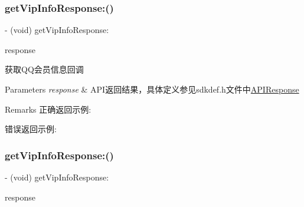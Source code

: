 \subsubsection{\texorpdfstring{get\+Vip\+Info\+Response\+:()}{getVipInfoResponse:()}\hspace{0.1cm}{\footnotesize\ttfamily [1/2]}}
{\footnotesize\ttfamily -\/ (void) get\+Vip\+Info\+Response\+: \begin{DoxyParamCaption}\item[{(\mbox{\hyperlink{interface_a_p_i_response}{A\+P\+I\+Response}} $\ast$)}]{response }\end{DoxyParamCaption}\hspace{0.3cm}{\ttfamily [optional]}}

获取\+Q\+Q会员信息回调 
\begin{DoxyParams}{Parameters}
{\em response} & A\+P\+I返回结果，具体定义参见sdkdef.\+h文件中\mbox{\hyperlink{interface_a_p_i_response}{A\+P\+I\+Response}} \\
\hline
\end{DoxyParams}
\begin{DoxyRemark}{Remarks}
正确返回示例\+: 
\begin{DoxyCodeInclude}
\end{DoxyCodeInclude}
 错误返回示例\+: 
\begin{DoxyCodeInclude}
\end{DoxyCodeInclude}

\end{DoxyRemark}
\mbox{\label{protocol_tencent_session_delegate-p_ad0d91a95626727d1dc20fb96df2d442a}} 
\subsubsection{\texorpdfstring{get\+Vip\+Info\+Response\+:()}{getVipInfoResponse:()}\hspace{0.1cm}{\footnotesize\ttfamily [2/2]}}
{\footnotesize\ttfamily -\/ (void) get\+Vip\+Info\+Response\+: \begin{DoxyParamCaption}\item[{(\mbox{\hyperlink{interface_a_p_i_response}{A\+P\+I\+Response}} $\ast$)}]{response }\end{DoxyParamCaption}\hspace{0.3cm}{\ttfamily [optional]}}


